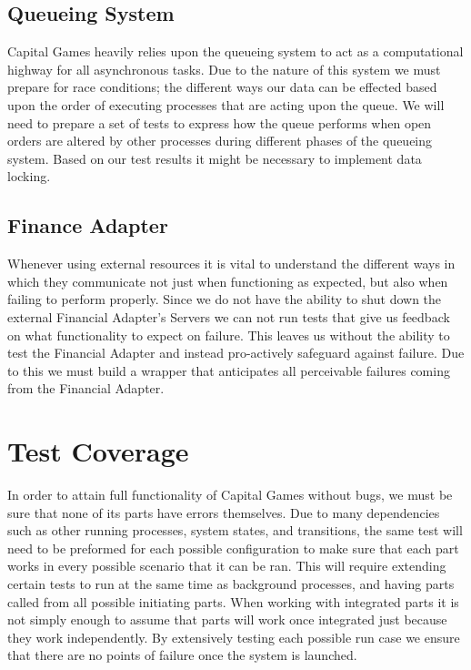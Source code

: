 \subsection{Queueing System}

Capital Games heavily relies upon the queueing system to act as a 
computational highway for all asynchronous tasks.  Due to the 
nature of this system we must prepare for race conditions; the 
different ways our data can be effected based upon the order of 
executing processes that are acting upon the queue. We will need 
to prepare a set of tests to express how the queue performs when 
open orders are altered by other processes during different phases 
of the queueing system. Based on our test results it might be 
necessary to implement data locking.

\subsection{Finance Adapter}

Whenever using external resources it is vital to understand the 
different ways in which they communicate not just when functioning 
as expected, but also when failing to perform properly.  Since we 
do not have the ability to shut down the external Financial 
Adapter's Servers we can not run tests that give us feedback on 
what functionality to expect on failure.  This leaves us without 
the ability to test the Financial Adapter and instead pro-actively 
safeguard against failure. Due to this we must build a wrapper that 
anticipates all perceivable failures coming from the Financial Adapter.

\section{Test Coverage}

In order to attain full functionality of Capital Games without bugs, 
we must be sure that none of its parts have errors themselves.  Due 
to many dependencies such as other running processes, system states, 
and transitions, the same test will need to be preformed for each 
possible configuration to make sure that each part works in every 
possible scenario that it can be ran. This will require extending 
certain tests to run at the same time as background processes, and 
having parts called from all possible initiating parts. When working 
with integrated parts it is not simply enough to assume that parts 
will work once integrated just because they work independently. By 
extensively testing each possible run case we ensure that there are 
no points of failure once the system is launched.


